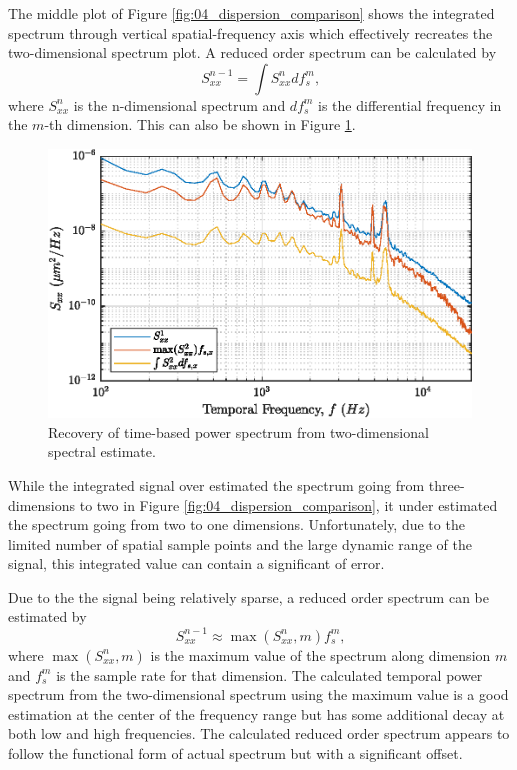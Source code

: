 The middle plot of Figure \ref{fig:04_dispersion_comparison} shows the integrated spectrum through vertical spatial-frequency axis which effectively recreates the two-dimensional spectrum plot.
A reduced order spectrum can be calculated by
\begin{equation}
  S_{xx}^{n-1} = \int S_{xx}^n df_s^m \textrm{,}
\end{equation}
where $S_{xx}^n$ is the n-dimensional spectrum and $df_s^m$ is the differential frequency in the $m$-th dimension.
This can also be shown in Figure \ref{fig:04_dispersion_max}.
\begin{figure}
  \centering
  \includegraphics{../matlab/04_dispersion_analysis/dispersion_max.eps}
  \caption{Recovery of time-based power spectrum from two-dimensional spectral estimate.}
  \label{fig:04_dispersion_max}
\end{figure}
While the integrated signal over estimated the spectrum going from three-dimensions to two in Figure \ref{fig:04_dispersion_comparison}, it under estimated the spectrum going from two to one dimensions.
Unfortunately, due to the limited number of spatial sample points and the large dynamic range of the signal, this integrated value can contain a significant of error.

Due to the the signal being relatively sparse, a reduced order spectrum can be estimated by
\begin{equation}
  S_{xx}^{n-1} \approx \max(S_{xx}^n,m)f_s^m \textrm{,}
\end{equation}
where $\max(S_{xx}^n,m)$ is the maximum value of the spectrum along dimension $m$ and $f_s^m$ is the sample rate for that dimension.
The calculated temporal power spectrum from the two-dimensional spectrum using the maximum value is a good estimation at the center of the frequency range but has some additional decay at both low and high frequencies.
The calculated reduced order spectrum appears to follow the functional form of actual spectrum but with a significant offset.

